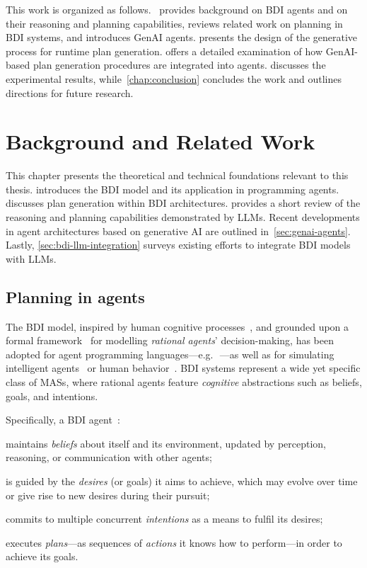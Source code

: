 \documentclass[12pt,a4paper,openright,twoside]{book}
\begin{document}
This work is organized as follows.~ provides background on \ac{BDI} agents and on their reasoning and planning capabilities, reviews related work on planning in \ac{BDI} systems, and introduces \ac{GenAI} agents. 
%
 presents the design of the generative process for runtime plan generation. 
%
 offers a detailed examination of how \ac{GenAI}-based plan generation procedures are integrated into \agentspeak{} agents.
%
 discusses the experimental results, while~\cref{chap:conclusion} concludes the work and outlines directions for future research.

\chapter{Background and Related Work}\label{chap:background}

This chapter presents the theoretical and technical foundations relevant to this thesis.
%
 introduces the \ac{BDI} model and its application in programming \agentspeak{} agents. 
%
 discusses plan generation within \ac{BDI} architectures.
%
 provides a short review of the reasoning and planning capabilities demonstrated by \acp{LLM}. 
%
Recent developments in agent architectures based on generative AI are outlined in~\cref{sec:genai-agents}. 
%
Lastly, \cref{sec:bdi-llm-integration} surveys existing efforts to integrate \ac{BDI} models with \acp{LLM}.

\section{Planning in \agentspeak{} agents}\label{sec:planning-bdi}

The \ac{BDI} model, inspired by human cognitive processes~\cite{BratmanEtAl1987}, and grounded upon a formal framework~\cite{bdilogic-jlc8} for modelling \emph{rational agents}' decision-making, has been adopted for agent programming languages---e.g.\,~\cite{BordiniHW2007}---as well as for simulating intelligent agents~\cite{HubnerB09} or human behavior~\cite{AdamGaudou2016}.
%
\ac{BDI} systems represent a wide yet specific class of \acp{MAS}, where rational agents feature \emph{cognitive} abstractions such as beliefs, goals, and intentions.

Specifically, a \ac{BDI} agent~\cite{RaoG95}:
%
\begin{inlinelist}
    \item maintains \emph{beliefs} about itself and its environment,
    updated by perception, reasoning, or communication with other agents;
    \item is guided by the \emph{desires} (or goals) it aims to achieve,
    which may evolve over time or give rise to new desires during their pursuit;
    \item commits to multiple concurrent \emph{intentions} as a means to fulfil its desires;
    \item executes \emph{plans}---as sequences of \emph{actions} it knows how to perform---in  order to achieve its goals.
\end{inlinelist}
\end{document}
